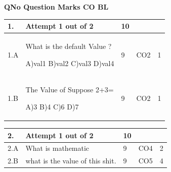 \documentclass[12pt]{article}
\begin{document}
	\begin{flushleft}
	\bf{QNo}\hspace{1.2cm} \bf{Question} \hspace{5.5cm}  \bf{Marks} \hspace{0.2cm} \bf{CO} \hspace{0.2cm}	\bf{BL}	
	
\end{flushleft} 
	\begin{longtable}{|L{1cm}|L{8cm}|C{1cm}|C{1cm}|C{1cm}|}\hline
		\bf{1}. & \bf{Attempt} \bf1 \bf{out} of \bf2 & \bf10  & & \\ \hline
				1.A & What is the default Value ? \newline
					
		A)val1\newline
		B)val2\newline
		C)val3\newline
		D)val4 &
		9 &
		CO2&
		1 \\ \hline
		
				1.B & The Value of Suppose 2+3= \newline
					
		A)3\newline
		B)4\newline
		C)6\newline
		D)7 &
		9 &
		CO2&
		1 \\ \hline
		
		
	\end{longtable}

	\begin{longtable}{|L{1cm}|L{8cm}|C{1cm}|C{1cm}|C{1cm}|}\hline
	\bf2. & \bf{Attempt} \bf{1} \bf{out of} \bf{2} & \bf{10}  & & \\ \hline





		2.A &
	What is mathematic \newline
			
	 &  9 & CO4 & 2\\ \hline
		2.B &
	what is the value of this shit. \newline
			
	 &  9 & CO5 & 4\\ \hline
	\end{longtable}
\end{document}
